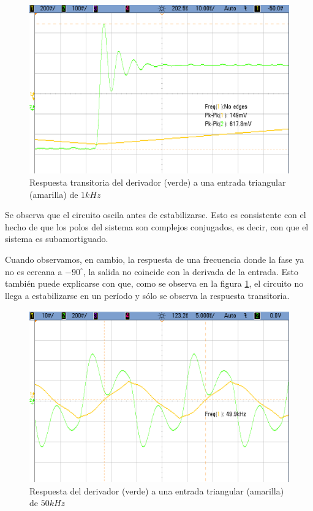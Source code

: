 \documentclass[../../main.tex]{subfiles}
\begin{document}
\begin{figure}  [H]
	\centering
	\includegraphics[scale=0.4]{fotos/tc_tp2_ej4_d_1k_transitorio.png}
	\caption{Respuesta transitoria del derivador (verde) a una entrada triangular (amarilla) de $1kHz$}
\end{figure}

Se observa que el circuito oscila antes de estabilizarse. Esto es consistente con el hecho de que los polos del sistema son complejos conjugados, es decir, con que el sistema es subamortiguado.\par


Cuando observamos, en cambio, la respuesta de una frecuencia donde la fase ya no es cercana a $-90^\circ$, la salida no coincide con la derivada de la entrada. Esto tambi\'en puede explicarse con que, como se observa en la figura \ref{fig:d-50k}, el circuito no llega a estabilizarse en un per\'iodo y s\'olo se observa la respuesta transitoria. 

\begin{figure}  [H]
	\centering
	\label{fig:d-50k}
	\includegraphics[scale=0.4]{fotos/tc_tp2_ej2_d_50k.png}
	\caption{Respuesta del derivador (verde) a una entrada triangular (amarilla) de $50kHz$}
\end{figure}
\end{document}
